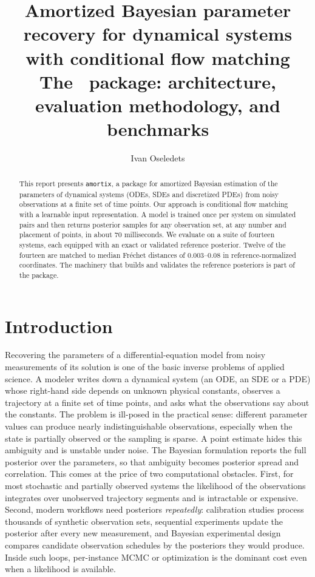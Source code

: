 \documentclass[10pt]{article}
\title{\textbf{Amortized Bayesian parameter recovery for dynamical systems\\
with conditional flow matching}\\[2mm]
\large The \amortix\ package: architecture, evaluation methodology, and benchmarks}
\author{Ivan Oseledets}
\date{}
\newcommand{\amortix}{\texttt{amortix}}
\begin{document}
\maketitle

\begin{abstract}
This report presents \amortix, a package for amortized Bayesian estimation of the parameters of
dynamical systems (ODEs, SDEs and discretized PDEs) from noisy observations at a finite set of time
points. Our approach is conditional flow matching with a learnable input representation. A model is
trained once per system on simulated pairs and then returns posterior samples for any observation set,
at any number and placement of points, in about $70$ milliseconds. We evaluate on a suite of fourteen
systems, each equipped with an exact or validated reference posterior. Twelve of the fourteen are
matched to median Fr\'echet distances of $0.003$--$0.08$ in reference-normalized coordinates. The
machinery that builds and validates the reference posteriors is part of the package.
\end{abstract}

\section{Introduction}
\label{sec:intro}

Recovering the parameters of a differential-equation model from noisy measurements of its solution is
one of the basic inverse problems of applied science. A modeler writes down a dynamical system (an ODE,
an SDE or a PDE) whose right-hand side depends on unknown physical constants, observes a trajectory at
a finite set of time points, and asks what the observations say about the constants. The problem is
ill-posed in the practical sense: different parameter values can produce nearly indistinguishable
observations, especially when the state is partially observed or the sampling is sparse. A point
estimate hides this ambiguity and is unstable under noise. The Bayesian formulation reports the full
posterior over the parameters, so that ambiguity becomes posterior spread and correlation. This comes
at the price of two computational obstacles. First, for most stochastic and partially observed systems
the likelihood of the observations integrates over unobserved trajectory segments and is intractable
or expensive. Second, modern workflows need posteriors \emph{repeatedly}: calibration studies process
thousands of synthetic observation sets, sequential experiments update the posterior after every new
measurement, and Bayesian experimental design compares candidate observation schedules by the
posteriors they would produce. Inside such loops, per-instance MCMC or optimization is the dominant
cost even when a likelihood is available.
\end{document}
